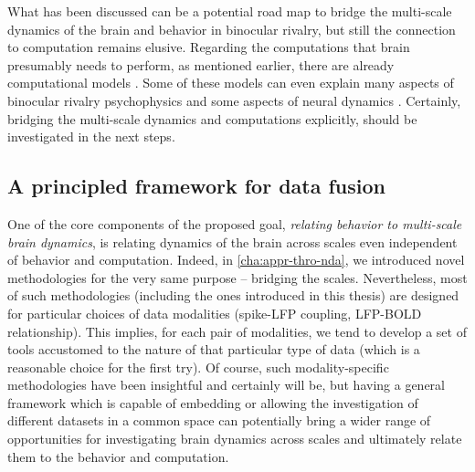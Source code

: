 What has been discussed can be a potential road map to bridge the multi-scale dynamics of the brain and behavior in binocular rivalry,
but still the connection to computation remains elusive.
Regarding the computations that brain presumably needs to perform, as mentioned earlier,
there are already computational models
\cite{bialekRandomSwitchingOptimal1995,dayanHierarchicalModelBinocular1998,hohwyPredictiveCodingExplains2008a,atwalStatisticalMechanicsMultistable2014a,samuelgershmanPerceptualMultistabilityMarkov2014a}.
Some of these models can even explain many aspects of binocular rivalry psychophysics and some aspects of neural dynamics \cite[Chapter 3]{leptourgosDynamicalCircularInference2018}.
Certainly, bridging the multi-scale dynamics and computations explicitly, should be investigated in the next steps. 

\subsection{A principled framework for data fusion}\label{sec:princ-framw-data}
One of the core components of the proposed goal, \emph{relating behavior to multi-scale brain dynamics},
is relating dynamics of the brain across scales even independent of behavior and computation.
Indeed, in \autoref{cha:appr-thro-nda}, we introduced novel methodologies for the very same purpose -- bridging the scales.
Nevertheless, most of such methodologies (including the ones introduced in this thesis) are designed for particular choices of data modalities (\eg spike-LFP coupling, LFP-BOLD relationship).
This implies, for each pair of modalities, we tend to develop a set of tools accustomed to the nature of that particular type of data (which is a reasonable choice for the first try).
Of course, such modality-specific methodologies have been insightful and certainly will be,
but having a general framework which is capable of embedding or allowing the investigation of different datasets in a common space
can potentially bring a wider range of opportunities for investigating brain dynamics across scales and ultimately relate them to the behavior and computation.

